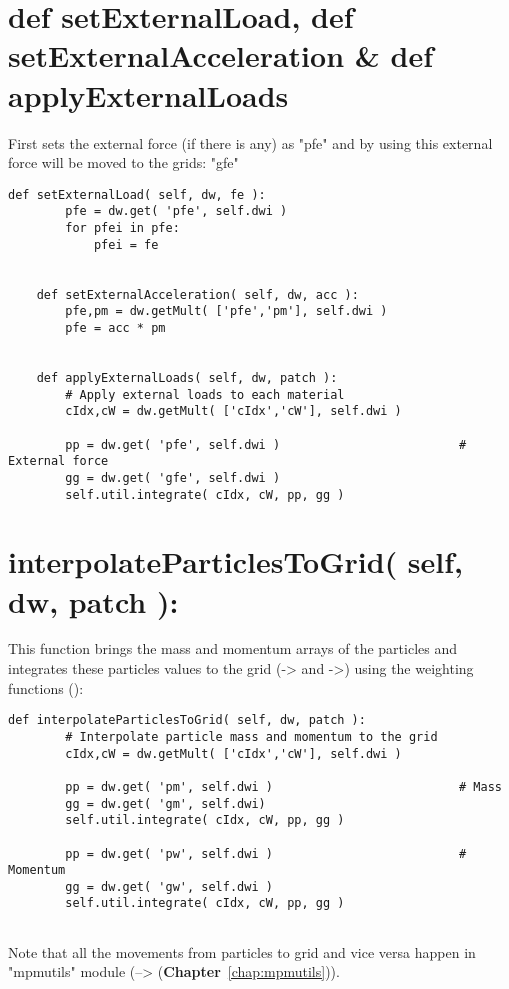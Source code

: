 \section{def setExternalLoad, def setExternalAcceleration \& def applyExternalLoads}
First \TT[setExternalLoad] sets the external force (if there is any) as "pfe" and by using  this external force will be moved to the grids: "gfe"
\begin{lstlisting}
def setExternalLoad( self, dw, fe ):
        pfe = dw.get( 'pfe', self.dwi )
        for pfei in pfe:
            pfei = fe
                
                
    def setExternalAcceleration( self, dw, acc ):
        pfe,pm = dw.getMult( ['pfe','pm'], self.dwi )
        pfe = acc * pm


    def applyExternalLoads( self, dw, patch ):
        # Apply external loads to each material
        cIdx,cW = dw.getMult( ['cIdx','cW'], self.dwi )
        
        pp = dw.get( 'pfe', self.dwi )                         # External force
        gg = dw.get( 'gfe', self.dwi )        
        self.util.integrate( cIdx, cW, pp, gg )         
\end{lstlisting}
\section{interpolateParticlesToGrid( self, dw, patch ):}
This function brings the mass and momentum arrays of the particles and integrates these particles values to the grid (-> and ->) using the weighting functions ():
\begin{lstlisting}
def interpolateParticlesToGrid( self, dw, patch ):
        # Interpolate particle mass and momentum to the grid
        cIdx,cW = dw.getMult( ['cIdx','cW'], self.dwi )     

        pp = dw.get( 'pm', self.dwi )                          # Mass
        gg = dw.get( 'gm', self.dwi)
        self.util.integrate( cIdx, cW, pp, gg )
        
        pp = dw.get( 'pw', self.dwi )                          # Momentum
        gg = dw.get( 'gw', self.dwi )
        self.util.integrate( cIdx, cW, pp, gg )            
        
\end{lstlisting}

Note that all the movements from particles to grid and vice versa happen in "mpmutils" module (--> (\textbf{Chapter}~\ref{chap:mpmutils})).


